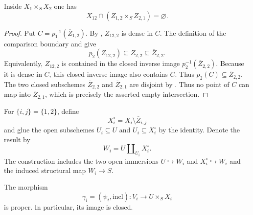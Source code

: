 \begin{lemma}
  \label{lemma:nagata-key-boundary-disjointness}

  Inside $X_1\times_SX_2$ one has
  \[
    X_{12}\cap
    (\overline Z_{1,2}\times_S\overline Z_{2,1})
    =\varnothing.
  \]
\end{lemma}

\begin{proof}
  Put $C=p_1^{-1}(\overline Z_{1,2})$.  By
  , $Z_{12,2}$ is dense in
  $C$.  The definition of the comparison boundary and
   give
  \[
    p_2(Z_{12,2})\subseteq Z_{2,2}\subseteq\overline Z_{2,2}.
  \]
  Equivalently, $Z_{12,2}$ is contained in the closed inverse image
  $p_2^{-1}(\overline Z_{2,2})$.  Because it is dense in $C$, this closed
  inverse image also contains $C$.  Thus
  $p_2(C)\subseteq\overline Z_{2,2}$.
  The two closed subschemes $\overline Z_{2,2}$ and
  $\overline Z_{2,1}$ are disjoint by
  .  Thus no point of $C$ can map into
  $\overline Z_{2,1}$, which is precisely the asserted empty intersection.
\end{proof}

\begin{definition}
  \label{def:nagata-two-open-intermediate-schemes}

  For $\{i,j\}=\{1,2\}$, define
  \[
    X_i^\circ=X_i\setminus\overline Z_{i,j}
  \]
  and glue the open subschemes $U_i\subseteq U$ and
  $U_i\subseteq X_i^\circ$ by the identity.  Denote the result by
  \[
    W_i=U\amalg_{U_i}X_i^\circ.
  \]
  The construction includes the two open immersions
  $U\hookrightarrow W_i$ and $X_i^\circ\hookrightarrow W_i$ and the induced
  structural map $W_i\to S$.
\end{definition}


\begin{lemma}
  \label{lemma:nagata-proper-extension-graph-closed}

  The morphism
  \[
    \gamma_i=(\psi_i,\mathrm{incl})\colon
    V_i\longrightarrow U\times_SX_i
  \]
  is proper.  In particular, its image is closed.
\end{lemma}

